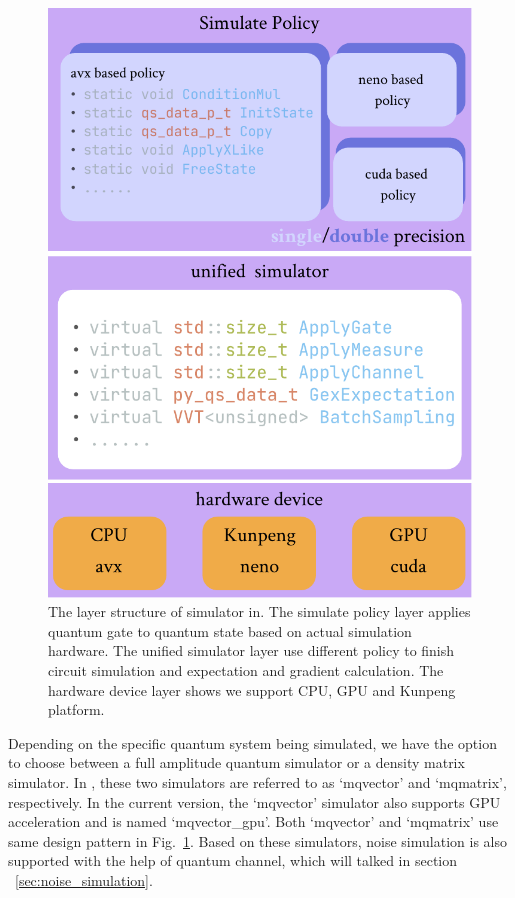 \begin{figure}[ht]
    \centering
    \includegraphics[scale=0.6]{./images/4_1_simulator_structure.pdf}
    \captionsetup{justification=raggedright,singlelinecheck=false}
    \caption{\label{4_1_sim_str} The layer structure of simulator in. The simulate policy layer applies quantum gate to quantum state based on actual simulation hardware. The unified simulator layer use different policy to finish circuit simulation and expectation and gradient calculation. The hardware device layer shows we support CPU, GPU and Kunpeng platform.}
\end{figure}

Depending on the specific quantum system being simulated, we have the option to choose between a full amplitude quantum simulator or a density matrix simulator. In \MindQuantum, these two simulators are referred to as `mqvector' and `mqmatrix', respectively. In the current \version version, the `mqvector' simulator also supports GPU acceleration and is named `mqvector\_gpu'. Both `mqvector' and `mqmatrix' use same design pattern in Fig.~\ref{4_1_sim_str}. Based on these simulators, noise simulation is also supported with the help of quantum channel, which will talked in section ~\ref{sec:noise_simulation}.
